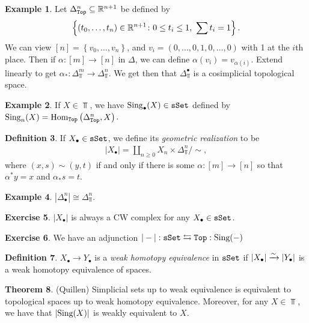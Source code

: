 \documentclass[12pt]{amsart}
\theoremstyle{definition}
\newtheorem{theorem}{Theorem}[section]
\newtheorem{definition}[theorem]{Definition}
\newtheorem{example}[theorem]{Example}
\newtheorem{exercise}[theorem]{Exercise}
\begin{document}
\begin{example} Let $\Delta^n_{\texttt{Top}} \subseteq \mathbb{R}^{n+1}$ be defined by
\begin{align*}
    \left\{ (t_0, \ldots, t_n) \in \R^{n+1} \colon 0 \le t_i \le 1,\ \sum t_i = 1 \right\}.
\end{align*}
We can view $[n] = \left\{ v_0, \ldots, v_n \right\}$, and $v_i = (0, \ldots, 0,1,0, \ldots, 0)$ with 1 at the $i$th place. Then if $\alpha : [m] \to [n]$ in $\Delta$, we can define $\alpha(v_i) =v_{\alpha(i)}$. Extend linearly to get $\alpha_\ast : \Delta^m_\Top \to \Delta^n_\Top$. We get then that $\Delta^\bullet_\Top$ is a cosimplicial topological space.
\end{example}

\begin{example} If $X \in \Top$, we have $\text{Sing}_\bullet(X) \in \texttt{sSet}$ defined by $\text{Sing}_n(X) = \text{Hom}_{\texttt{Top}} \left( \Delta_{\texttt{Top}}^n, X \right)$.
\end{example}

\begin{definition} If $X_\bullet \in \texttt{sSet}$, we define its \textit{geometric realization} to be
\begin{align*}
    |X_\bullet| = \amalg_{n\ge 0} X_n \times \Delta^n_\Top / \sim,
\end{align*}
where $(x,s)\sim (y,t)$ if and only if there is some $\alpha : [m] \to [n]$ so that $\alpha^\ast y = x$ and $\alpha_\ast s = t$.
\end{definition}


\begin{example} $|\Delta^n_\bullet| \cong \Delta^n_\Top$.
\end{example}

\begin{exercise} $|X_\bullet|$ is always a CW complex for any $X_\bullet \in \texttt{sSet}$.
\end{exercise}

\begin{exercise} We have an adjunction $|-| : \texttt{sSet} \leftrightarrows \texttt{Top}: \text{Sing}(-)$
\end{exercise}

\begin{definition} $X_\bullet \to Y_\bullet$ is a \textit{weak homotopy equivalence} in $\texttt{sSet}$ if $|X_\bullet| \xrightarrow{\sim} |Y_\bullet|$ is a weak homotopy equivalence of spaces.
\end{definition}

\begin{theorem} (Quillen) Simplicial sets up to weak equivalence is equivalent to topological spaces up to weak homotopy equivalence. Moreover, for any $X\in \Top$, we have that $|\text{Sing}(X)|$ is weakly equivalent to $X$.
\end{theorem}
\end{document}
